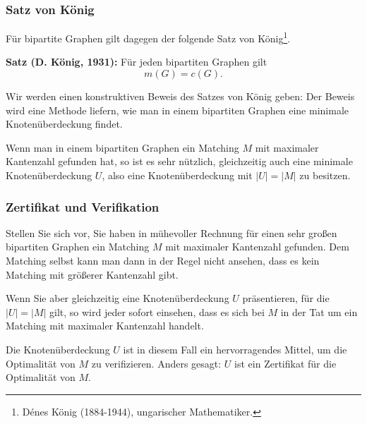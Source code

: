 \documentclass[smaller]{beamer}
\begin{document}
\begin{frame}
 \frametitle{Satz von König}
 Für bipartite Graphen gilt dagegen der folgende \alert{Satz von König}\footnote{Dénes König (1884-1944), ungarischer Mathematiker.}. \\ \vspace*{0.2cm}
 
 \textbf{Satz (D. König, 1931):} Für jeden bipartiten Graphen gilt
\begin{equation}
\label{eq:11:2}
m(G) = c(G).
\end{equation}

Wir werden einen \alert{konstruktiven Beweis des Satzes von König} geben: \alert{Der Beweis wird eine Methode liefern, wie man in einem bipartiten Graphen eine minimale Knotenüberdeckung findet}. \\ \vspace*{0.2cm}

Wenn man in einem bipartiten Graphen ein Matching $M$ mit maximaler Kantenzahl gefunden hat, \alert{so ist es sehr nützlich, gleichzeitig auch eine minimale Knotenüberdeckung $U$, also eine Knotenüberdeckung mit $|U|=|M|$ zu besitzen}.
\end{frame}

\begin{frame}
 \frametitle{Zertifikat und Verifikation}
 Stellen Sie sich vor, Sie haben in mühevoller Rechnung für einen sehr großen bipartiten Graphen ein Matching $M$ mit maximaler Kantenzahl gefunden. Dem Matching selbst kann man dann in der Regel nicht ansehen, dass es kein Matching mit größerer Kantenzahl gibt. \\ \vspace*{0.2cm}
 
 Wenn Sie aber gleichzeitig eine Knotenüberdeckung $U$ präsentieren, für die $|U|=|M|$ gilt, so wird jeder sofort einsehen, dass es sich bei $M$ in der Tat um ein Matching mit maximaler Kantenzahl handelt. \\ \vspace*{0.2cm}
 
 Die Knotenüberdeckung $U$ ist in diesem Fall ein hervorragendes Mittel, um die Optimalität von $M$ zu \alert{verifizieren}. Anders gesagt: $U$ ist ein \alert{Zertifikat} für die Optimalität von $M$.
\end{frame}
\end{document}
